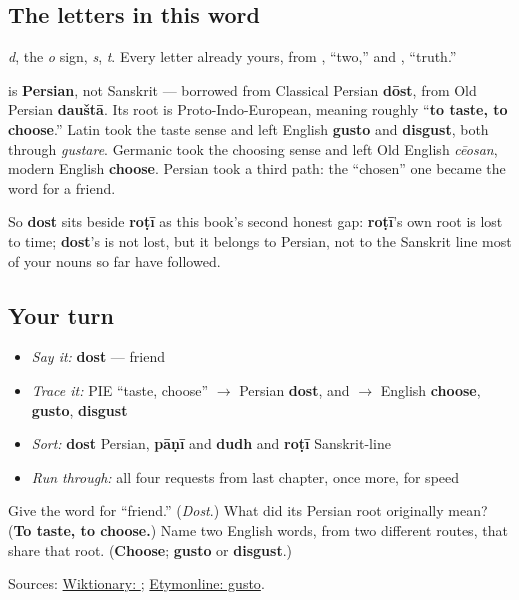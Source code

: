 \subsection*{The letters in this word}
\textbf{} \emph{d}, \textbf{} the \emph{o} sign, \textbf{} \emph{s}, \textbf{} \emph{t}. Every letter already yours, from \textbf{}, \textquotedblleft{}two,\textquotedblright{} and \textbf{}, \textquotedblleft{}truth.\textquotedblright{}

\begin{cousinweb}
\textbf{} is \textbf{Persian}, not Sanskrit — borrowed from Classical Persian \textbf{dōst}, from Old Persian \textbf{dauštā}. Its root is Proto-Indo-European, meaning roughly \textquotedblleft{}\textbf{to taste, to choose}.\textquotedblright{} Latin took the taste sense and left English \textbf{gusto} and \textbf{disgust}, both through \emph{gustare}. Germanic took the choosing sense and left Old English \emph{cēosan}, modern English \textbf{choose}. Persian took a third path: the \textquotedblleft{}chosen\textquotedblright{} one became the word for a friend.

So \textbf{dost} sits beside \textbf{roṭī} as this book's second honest gap: \textbf{roṭī}'s own root is lost to time; \textbf{dost}'s is not lost, but it belongs to Persian, not to the Sanskrit line most of your nouns so far have followed.
\end{cousinweb}

\subsection*{Your turn}
\begin{itemize}
\raggedright
  \item \emph{Say it:} \textbf{dost} — friend
  \item \emph{Trace it:} PIE \textquotedblleft{}taste, choose\textquotedblright{} $\to$ Persian \textbf{dost}, and $\to$ English \textbf{choose}, \textbf{gusto}, \textbf{disgust}
  \item \emph{Sort:} \textbf{dost} Persian, \textbf{pāṇī} and \textbf{dudh} and \textbf{roṭī} Sanskrit-line
  \item \emph{Run through:} all four requests from last chapter, once more, for speed
\end{itemize}

\begin{tcolorbox}[breakable,colback=teal!4,colframe=teal!35!black,title={Before you move on}]
Give the word for \textquotedblleft{}friend.\textquotedblright{} (\emph{Dost}.) What did its Persian root originally mean? (\textbf{To taste, to choose.}) Name two English words, from two different routes, that share that root. (\textbf{Choose}; \textbf{gusto} or \textbf{disgust}.)

Sources: \href{https://en.wiktionary.org/wiki/\%E0\%A8\%A6\%E0\%A9\%8B\%E0\%A8\%B8\%E0\%A8\%A4}{Wiktionary: }; \href{https://www.etymonline.com/word/gusto}{Etymonline: gusto}.
\end{tcolorbox}
